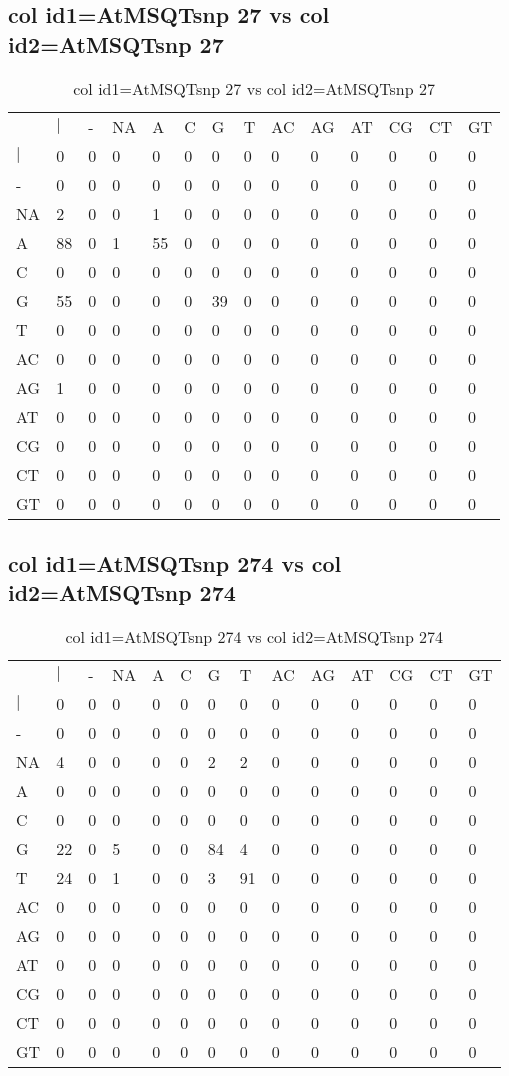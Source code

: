 \subsection{col id1=AtMSQTsnp 27 vs col id2=AtMSQTsnp 27}
\begin{center}
\begin{longtable}{|l|l|l|l|l|l|l|l|l|l|l|l|l|l|}
\caption{col id1=AtMSQTsnp 27 vs col id2=AtMSQTsnp 27} \label{table_dm612}\\
\hline
\\
\hline
&$|$&-&NA&A&C&G&T&AC&AG&AT&CG&CT&GT\\
$|$&0&0&0&0&0&0&0&0&0&0&0&0&0\\
-&0&0&0&0&0&0&0&0&0&0&0&0&0\\
NA&2&0&0&1&0&0&0&0&0&0&0&0&0\\
A&88&0&1&55&0&0&0&0&0&0&0&0&0\\
C&0&0&0&0&0&0&0&0&0&0&0&0&0\\
G&55&0&0&0&0&39&0&0&0&0&0&0&0\\
T&0&0&0&0&0&0&0&0&0&0&0&0&0\\
AC&0&0&0&0&0&0&0&0&0&0&0&0&0\\
AG&1&0&0&0&0&0&0&0&0&0&0&0&0\\
AT&0&0&0&0&0&0&0&0&0&0&0&0&0\\
CG&0&0&0&0&0&0&0&0&0&0&0&0&0\\
CT&0&0&0&0&0&0&0&0&0&0&0&0&0\\
GT&0&0&0&0&0&0&0&0&0&0&0&0&0\\
\hline
\end{longtable}
\end{center}

\subsection{col id1=AtMSQTsnp 274 vs col id2=AtMSQTsnp 274}
\begin{center}
\begin{longtable}{|l|l|l|l|l|l|l|l|l|l|l|l|l|l|}
\caption{col id1=AtMSQTsnp 274 vs col id2=AtMSQTsnp 274} \label{table_dm614}\\
\hline
\\
\hline
&$|$&-&NA&A&C&G&T&AC&AG&AT&CG&CT&GT\\
$|$&0&0&0&0&0&0&0&0&0&0&0&0&0\\
-&0&0&0&0&0&0&0&0&0&0&0&0&0\\
NA&4&0&0&0&0&2&2&0&0&0&0&0&0\\
A&0&0&0&0&0&0&0&0&0&0&0&0&0\\
C&0&0&0&0&0&0&0&0&0&0&0&0&0\\
G&22&0&5&0&0&84&4&0&0&0&0&0&0\\
T&24&0&1&0&0&3&91&0&0&0&0&0&0\\
AC&0&0&0&0&0&0&0&0&0&0&0&0&0\\
AG&0&0&0&0&0&0&0&0&0&0&0&0&0\\
AT&0&0&0&0&0&0&0&0&0&0&0&0&0\\
CG&0&0&0&0&0&0&0&0&0&0&0&0&0\\
CT&0&0&0&0&0&0&0&0&0&0&0&0&0\\
GT&0&0&0&0&0&0&0&0&0&0&0&0&0\\
\hline
\end{longtable}
\end{center}

